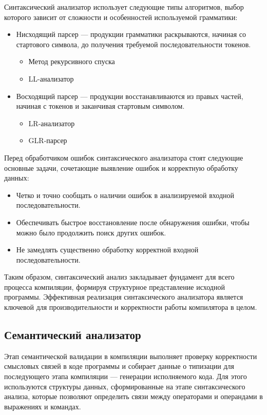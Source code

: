 Синтаксический анализатор использует следующие типы алгоритмов, выбор которого зависит от сложности и особенностей используемой грамматики:
\begin{itemize}[label = ---]
    \item Нисходящий парсер — продукции грамматики раскрываются, начиная со стартового символа, до получения требуемой последовательности токенов.
    \begin{itemize}[label = +]
        \item Метод рекурсивного спуска
        \item LL-анализатор
    \end{itemize}
    \item Восходящий парсер — продукции восстанавливаются из правых частей, начиная с токенов и заканчивая стартовым символом.
    \begin{itemize}[label = +]
        \item LR-анализатор
        \item GLR-парсер
    \end{itemize}
\end{itemize}

Перед обработчиком ошибок синтаксического анализатора стоят следующие основные задачи, сочетающие выявление ошибок и корректную обработку данных:
\begin{itemize}[label = ---]
    \item Четко и точно сообщать о наличии ошибок в анализируемой входной последовательности.
    \item Обеспечивать быстрое восстановление после обнаружения ошибки, чтобы можно было продолжить поиск других ошибок.
    \item Не замедлять существенно обработку корректной входной последовательности.
\end{itemize}


Таким образом, синтаксический анализ закладывает фундамент для всего процесса компиляции, формируя структурное представление исходной программы. Эффективная реализация синтаксического анализатора является ключевой для производительности и корректности работы компилятора в целом.

\subsection{Семантический анализатор}
Этап семантической валидации в компиляции выполняет проверку корректности смысловых связей в коде программы и собирает данные о типизации для последующего этапа компиляции — генерации исполняемого кода. Для этого используются структуры данных, сформированные на этапе синтаксического анализа, которые позволяют определить связи между операторами и операндами в выражениях и командах.

